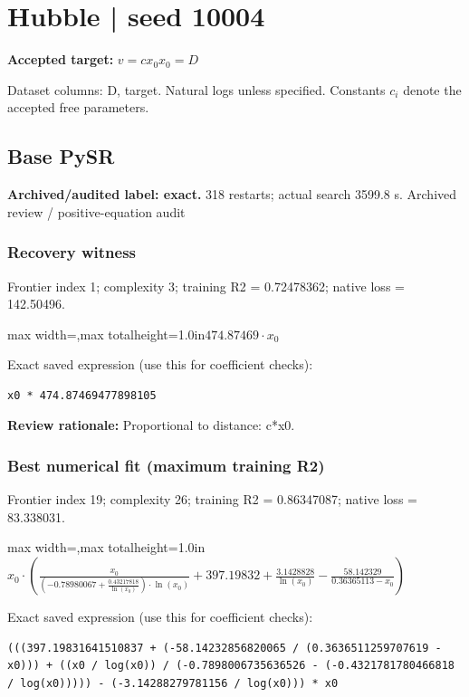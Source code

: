 \documentclass[10pt,letterpaper,landscape]{article}
\begin{document}
\section*{Hubble | seed 10004}
\textbf{Accepted target:} $\displaystyle v=c x_0$\hfill $x_0=D$\par
{\small Dataset columns: D, target. Natural logs unless specified. Constants $c_i$ denote the accepted free parameters.}\par\medskip
\begin{minipage}[t]{0.485\textwidth}
\subsection*{Base PySR}
\textbf{Archived/audited label: exact.} 318 restarts; actual search 3599.8 s.
{\small Archived review / positive-equation audit}
\subsubsection*{Recovery witness}
Frontier index 1; complexity 3; training R2 = 0.72478362; native loss = 142.50496.
\begin{center}\begin{adjustbox}{max width=\linewidth,max totalheight=1.0in}$\displaystyle 474.87469 \cdot x_{0}$\end{adjustbox}\end{center}
{\scriptsize Exact saved expression (use this for coefficient checks):}
\begin{lstlisting}
x0 * 474.87469477898105
\end{lstlisting}
{\small\textbf{Review rationale:} Proportional to distance: c*x0.}
\subsubsection*{Best numerical fit (maximum training R2)}
Frontier index 19; complexity 26; training R2 = 0.86347087; native loss = 83.338031.
\begin{center}\begin{adjustbox}{max width=\linewidth,max totalheight=1.0in}$\displaystyle x_{0} \cdot \left(\frac{x_{0}}{\left(-0.78980067 + \frac{0.43217818}{\ln{\left(x_{0} \right)}}\right) \cdot \ln{\left(x_{0} \right)}} + 397.19832 + \frac{3.1428828}{\ln{\left(x_{0} \right)}} - \frac{58.142329}{0.36365113 - x_{0}}\right)$\end{adjustbox}\end{center}
{\scriptsize Exact saved expression (use this for coefficient checks):}
\begin{lstlisting}
(((397.19831641510837 + (-58.14232856820065 / (0.3636511259707619 - x0))) + ((x0 / log(x0)) / (-0.7898006735636526 - (-0.4321781780466818 / log(x0))))) - (-3.14288279781156 / log(x0))) * x0
\end{lstlisting}
\end{minipage}\hfill
\end{document}
